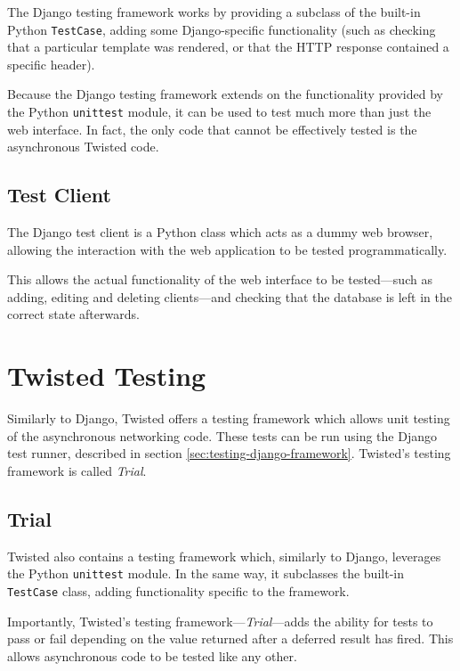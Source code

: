 The Django testing framework works by providing a subclass of the built-in
Python \verb!TestCase!, adding some Django-specific functionality (such as
checking that a particular template was rendered, or that the HTTP response
contained a specific header).

Because the Django testing framework extends on the functionality provided by
the Python \verb!unittest! module, it can be used to test much more than just
the web interface. In fact, the only code that cannot be effectively tested is
the asynchronous Twisted code.

\subsection{Test Client}
\label{sec:testing-django-client}

The Django test client is a Python class which acts as a dummy web browser,
allowing the interaction with the web application to be tested
programmatically.

This allows the actual functionality of the web interface to be tested---such
as adding, editing and deleting clients---and checking that the database is
left in the correct state afterwards.

\section{Twisted Testing}
\label{sec:testing-twisted}

Similarly to Django, Twisted offers a testing framework which allows unit
testing of the asynchronous networking code. These tests can be run using the
Django test runner, described in section \ref{sec:testing-django-framework}.
Twisted's testing framework is called \emph{Trial}.

\subsection{Trial}
\label{sec:testing-twisted-trial}

Twisted also contains a testing framework which, similarly to Django, leverages
the Python \verb!unittest! module. In the same way, it subclasses the built-in
\verb!TestCase! class, adding functionality specific to the framework.

Importantly, Twisted's testing framework---\emph{Trial}---adds the ability for
tests to pass or fail depending on the value returned after a deferred result
has fired. This allows asynchronous code to be tested like any other.

